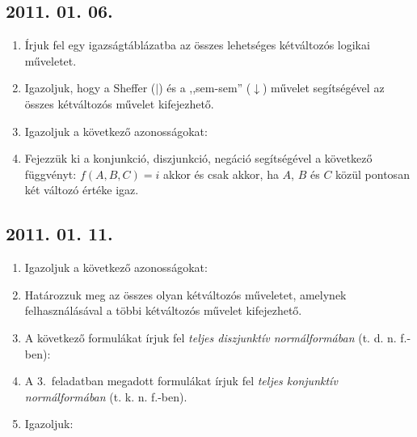 \subsection*{2011. 01. 06.}
\begin{enumerate}
\item Írjuk fel egy igazságtáblázatba az összes lehetséges kétváltozós logikai műveletet.
\item Igazoljuk, hogy a Sheffer ($|$) és a ,,sem-sem'' ($\downarrow$) művelet segítségével az összes kétváltozós művelet kifejezhető.
\item Igazoljuk a következő azonosságokat:
\item Fejezzük ki a konjunkció, diszjunkció, negáció segítségével a következő függvényt: $f(A,B,C)=i$ akkor és csak akkor, ha $A$, $B$ és $C$ közül pontosan két változó értéke igaz.
\end{enumerate}

\subsection*{2011. 01. 11.}
\begin{enumerate}
\item Igazoljuk a következő azonosságokat:
\item Határozzuk meg az összes olyan kétváltozós műveletet, amelynek felhasználásával a többi kétváltozós művelet kifejezhető.
\item A következő formulákat írjuk fel \emph{teljes diszjunktív normálformában} (t. d. n. f.-ben):
\item A 3.~feladatban megadott formulákat írjuk fel \emph{teljes konjunktív normálformában} (t. k. n. f.-ben).
\item Igazoljuk:
\end{enumerate}


